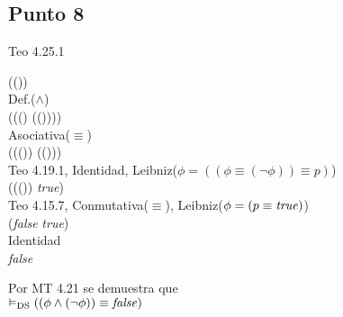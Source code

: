 \documentclass{article}
\begin{document}
\subsection{Punto 8}
\begin{logicenv}{Teo 4.25.1}
    \begin{derivation}
            (\phi \land (\neg \phi))\\
        Def.($\land$)\\
            (\phi \equiv ((\neg \phi) \equiv (\phi \lor (\neg \phi))))\\
        Asociativa($\equiv$)\\
            ((\phi \equiv (\neg \phi)) \equiv (\phi \lor (\neg \phi)))\\
        Teo 4.19.1, Identidad, Leibniz($\phi = ((\phi \equiv (\neg \phi)) \equiv p)$)\\
            ((\phi \equiv (\neg \phi)) \equiv \textrm{\textit{true}})\\
        Teo 4.15.7, Conmutativa($\equiv$), Leibniz($\phi = (p \equiv \textrm{\textit{true}})$)\\
            (\textrm{\textit{false}} \equiv \textrm{\textit{true}})\\
        Identidad\\
            \textrm{\textit{false}}
    \end{derivation}
    Por MT 4.21 se demuestra que\\
    $\vDash_{\text{DS}} ((\phi \land (\neg \phi)) \equiv \textrm{\textit{false}})$
\end{logicenv}
\end{document}
